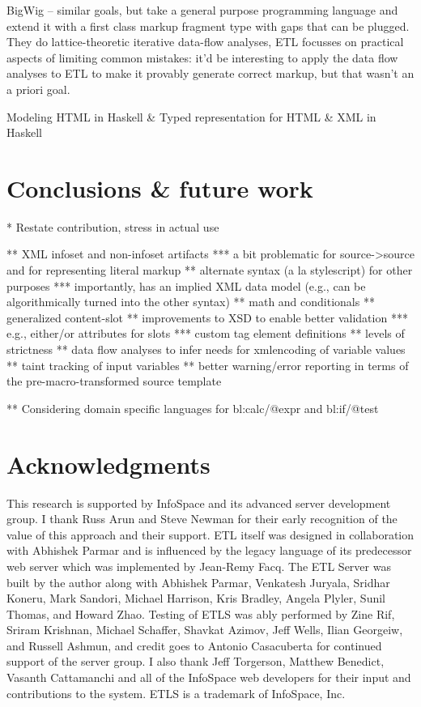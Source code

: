 \documentclass{www2003-submission}
\begin{document}
BigWig -- similar goals, but take a general purpose programming
language and extend it with a first class markup fragment type with
gaps that can be plugged.  They do lattice-theoretic iterative
data-flow analyses, ETL focusses on practical aspects of limiting
common mistakes:  it'd be interesting to apply the data flow analyses
to ETL to make it provably generate correct markup, but that wasn't an
a priori goal.

Modeling HTML in Haskell \& Typed representation for HTML \& XML in Haskell


\section{Conclusions \& future work}
\label{sec-conclusion}

* Restate contribution, stress in actual use


** XML infoset and non-infoset artifacts
*** a bit problematic for source->source and for representing literal markup
** alternate syntax (a la stylescript) for other purposes
*** importantly, has an implied XML data model (e.g., can be algorithmically turned into the other syntax)
** math and conditionals
** generalized content-slot
** improvements to XSD to enable better validation
*** e.g., either/or attributes for slots
*** custom tag element definitions
** levels of strictness
** data flow analyses to infer needs for xmlencoding of variable values
** taint tracking of input variables
** better warning/error reporting in terms of the pre-macro-transformed source template

** Considering domain specific languages for bl:calc/@expr and bl:if/@test

\section{Acknowledgments}
\label{sec-ack}
This research is supported by InfoSpace and its advanced server
development group.  I thank Russ Arun and Steve Newman for their early
recognition of the value of this approach and their support.  ETL
itself was designed in collaboration with Abhishek Parmar and is
influenced by the legacy language of its predecessor web server which
was implemented by Jean-Remy Facq.  The ETL Server was built by the
author along with Abhishek Parmar, Venkatesh Juryala, Sridhar Koneru,
Mark Sandori, Michael Harrison, Kris Bradley, Angela Plyler, Sunil
Thomas, and Howard Zhao.  Testing of ETLS was ably performed by Zine
Rif, Sriram Krishnan, Michael Schaffer, Shavkat Azimov, Jeff Wells,
Ilian Georgeiw, and Russell Ashmun, and credit goes to Antonio
Casacuberta for continued support of the server group.  I also thank
Jeff Torgerson, Matthew Benedict, Vasanth Cattamanchi and all of the
InfoSpace web developers for their input and contributions to
the system. ETLS is a trademark of InfoSpace, Inc.




%
\end{document}
